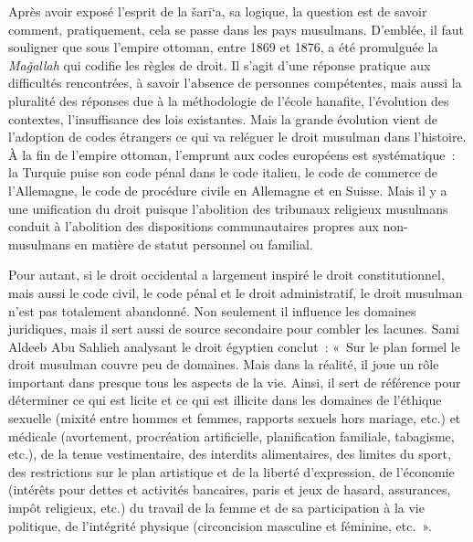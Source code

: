 Après avoir exposé l'esprit de la šarī`a, sa logique, la question est de
savoir comment, pratiquement, cela se passe dans les pays musulmans.
D'emblée, il faut souligner que sous l'empire ottoman, entre 1869 et
1876, a été promulguée la \emph{Maǧallah} qui codifie les règles de
droit. Il s'agit d'une réponse pratique aux difficultés rencontrées, à
savoir l'absence de personnes compétentes, mais aussi la pluralité des
réponses due à la méthodologie de l'école hanafite, l'évolution des
contextes, l'insuffisance des lois existantes. Mais la grande évolution
vient de l'adoption de codes étrangers ce qui va reléguer le droit
musulman dans l'histoire. À la fin de l'empire ottoman, l'emprunt aux
codes européens est systématique~: la Turquie puise son code pénal dans
le code italien, le code de commerce de l'Allemagne, le code de
procédure civile en Allemagne et en Suisse. Mais il y a une unification
du droit puisque l'abolition des tribunaux religieux musulmans conduit à
l'abolition des dispositions communautaires propres aux non-musulmans en
matière de statut personnel ou familial.

Pour autant, si le droit occidental a largement inspiré le droit
constitutionnel, mais aussi le code civil, le code pénal et le droit
administratif, le droit musulman n'est pas totalement abandonné. Non
seulement il influence les domaines juridiques, mais il sert aussi de
source secondaire pour combler les lacunes. Sami Aldeeb Abu Sahlieh
analysant le droit égyptien conclut~: «~Sur le plan formel le droit
musulman couvre peu de domaines. Mais dans la réalité, il joue un rôle
important dans presque tous les aspects de la vie. Ainsi, il sert de
référence pour déterminer ce qui est licite et ce qui est illicite dans
les domaines de l'éthique sexuelle (mixité entre hommes et femmes,
rapports sexuels hors mariage, etc.) et médicale (avortement,
procréation artificielle, planification familiale, tabagisme, etc.), de
la tenue vestimentaire, des interdits alimentaires, des limites du
sport, des restrictions sur le plan artistique et de la liberté
d'expression, de l'économie (intérêts pour dettes et activités
bancaires, paris et jeux de hasard, assurances, impôt religieux, etc.)
du travail de la femme et de sa participation à la vie politique, de
l'intégrité physique (circoncision masculine et féminine,
etc.~».


